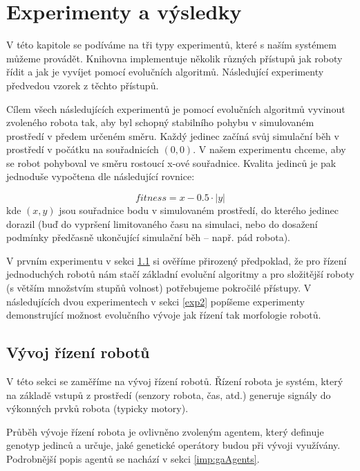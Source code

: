\chapter{Experimenty a výsledky}

V této kapitole se podíváme na tři typy experimentů, které s naším systémem
můžeme provádět. Knihovna implementuje několik různých přístupů jak roboty
řídit a jak je vyvíjet pomocí evolučních algoritmů. Následující experimenty
předvedou vzorek z těchto přístupů. 

Cílem všech následujících experimentů je pomocí evolučních algoritmů vyvinout
zvoleného robota tak, aby byl schopný stabilního pohybu v simulovaném prostředí
v předem určeném směru. Každý jedinec začíná svůj simulační běh v prostředí v
počátku na souřadnicích $(0,0)$. V našem experimentu chceme, aby se robot
pohyboval ve směru rostoucí x-ové souřadnice. Kvalita jedinců je pak jednoduše
vypočtena dle následující rovnice:

\begin{equation} \label{fitness_calc}
    fitness = x - 0.5\cdot|y|
\end{equation}
kde $(x,y)$ jsou souřadnice bodu v simulovaném prostředí, do kterého jedinec
dorazil (buď do vypršení limitovaného času na simulaci, nebo do dosažení
podmínky předčasně ukončující simulační běh -- např. pád robota).

V prvním experimentu v sekci \ref{exp1} si ověříme přirozený předpoklad, že pro
řízení jednoduchých robotů nám stačí základní evoluční algoritmy a pro
složitější roboty (s větším množstvím stupňů volnost) potřebujeme pokročilé
přístupy. V následujících dvou experimentech v sekci \ref{exp2} popíšeme
experimenty demonstrující možnost evolučního vývoje jak řízení tak morfologie
robotů.

\section{Vývoj řízení robotů} \label{exp1}

V této sekci se zaměříme na vývoj řízení robotů. Řízení robota je systém,
který na základě vstupů z prostředí (senzory robota, čas, atd.) generuje
signály do výkonných prvků robota (typicky motory). 

Průběh vývoje řízení robota je ovlivněno zvoleným agentem, který definuje
genotyp jedinců a určuje, jaké genetické operátory budou při vývoji využívány.
Podrobnější popis agentů se nachází v sekci \ref{imp:gaAgents}.

